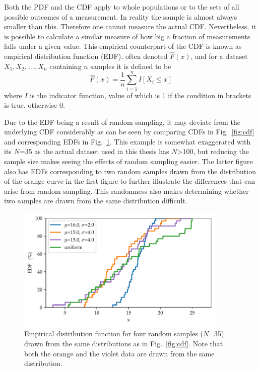 \documentclass[english, twoside]{HYgradu}
\begin{document}
Both the PDF and the CDF apply to whole populations or to the sets of all possible outcomes of a measurement. In reality the sample is almost always smaller than this. Therefore one cannot measure the actual CDF. Nevertheless, it is possible to calculate a similar measure of how big a fraction of measurements falls under a given value. This empirical counterpart of the CDF is known as empirical distribution function (EDF), often denoted $\hat F(x)$, and for a dataset $X_1, X_2,\,..., X_n$ containing $n$ samples it is defined to be
\begin{equation}
	\hat F(x) = \frac{1}{n}\sum_{i=1}^n I[X_i \leq x]
\end{equation}
where $I$ is the indicator function, value of which is 1 if the condition in brackets is true, otherwise 0. \citep{feigelson2012modern}

Due to the EDF being a result of random sampling, it may deviate from the underlying CDF considerably as can be seen by comparing CDFs in Fig.\ \ref{fig:cdf} and corresponding EDFs in Fig.\ \ref{fig:edf}. This example is somewhat exaggerated with its $N$=35 as the actual dataset used in this thesis has $N$>100, but reducing the sample size makes seeing the effects of random sampling easier. The latter figure also has EDFs corresponding to two random samples drawn from the distribution of the orange curve in the first figure to further illustrate the differences that can arise from random sampling. This randomness also makes determining whether two samples are drawn from the same distribution difficult.

\begin{figure}
   \centering
   \includegraphics[width=0.9\textwidth]{kuvat/edf.pdf}
   \caption{Empirical distribution function for four random samples ($N$=35) drawn from the same distributions as in Fig.\ \ref{fig:cdf}. Note that both the orange and the violet data are drawn from the same distribution.}
   \label{fig:edf}
\end{figure}
\end{document}
